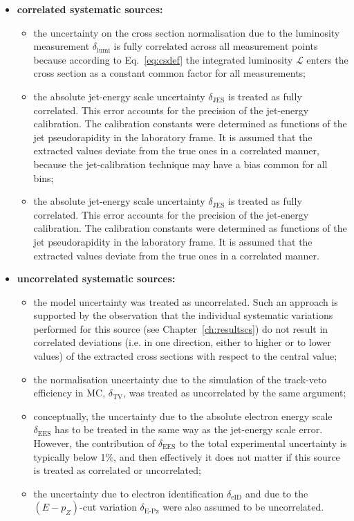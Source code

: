 \begin{itemize}
 \item \textbf{correlated systematic sources:}
 \begin{itemize}
 \item the uncertainty on the cross section normalisation due to the luminosity measurement $\delta_\text{lumi}$ is fully correlated across all measurement points because according to Eq.~\eqref{eq:csdef} the integrated luminosity $\mathcal{L}$ enters the cross section as a constant common factor for all measurements;
 \item the absolute jet-energy scale uncertainty $\delta_\text{JES}$ is treated as fully correlated. This error accounts for the precision of the jet-energy calibration. The calibration constants were determined as functions of the jet pseudorapidity in the laboratory frame. It is assumed that the extracted values deviate from the true ones in a correlated manner, because the jet-calibration technique may have a bias common for all bins;
 \item the absolute jet-energy scale uncertainty $\delta_\text{JES}$ is treated as fully correlated. This error accounts for the precision of the jet-energy calibration. The calibration constants were determined as functions of the jet pseudorapidity in the laboratory frame. It is assumed that the extracted values deviate from the true ones in a correlated manner.
 \end{itemize}
 \item \textbf{uncorrelated systematic sources:}
 \begin{itemize}
 \item the model uncertainty was treated as uncorrelated. Such an approach is supported by the observation that the individual systematic variations performed for this source (see Chapter~\ref{ch:resultscs}) do not result in correlated deviations (i.e. in one direction, either to higher or to lower values) of the extracted cross sections with respect to the central value;
 \item the normalisation uncertainty due to the simulation of the track-veto efficiency in MC, $\delta_\text{TV}$, was treated as uncorrelated by the same argument;
 \item conceptually, the uncertainty due to the absolute electron energy scale $\delta_\text{EES}$ has to be treated in the same way as the jet-energy scale error. However, the contribution of $\delta_\text{EES}$ to the total experimental uncertainty is typically below 1\%, and then effectively it does not matter if this source is treated as correlated or uncorrelated;
 \item the uncertainty due to electron identification $\delta_\text{eID}$ and due to the $\left(E-p_Z\right)$-cut variation $\delta_\text{E-Pz}$ were also assumed to be uncorrelated.
 \end{itemize}
\end{itemize}
